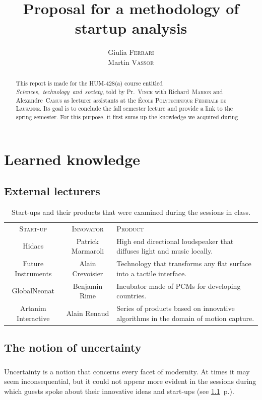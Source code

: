 \documentclass[twoside]{report}
\title{Proposal for a methodology of startup analysis}
\author{Giulia \textsc{Ferrari}\\Martin \textsc{Vassor}}
\begin{document}
\maketitle
\begin{abstract}
	This report is made for the HUM-428(a) course entitled \emph{Sciences,~technology~and~society}, told by Pr.~\textsc{Vinck} with Richard~\textsc{Marion} and Alexandre~\textsc{Camus} as lecturer assistants at the \textsc{École Polytechnique Fédérale de Lausanne}. Its goal is to conclude the fall semester lecture and provide a link to the spring semester. For this purpose, it first sums up the knowledge we acquired during 
\end{abstract}
\tableofcontents
\listoffigures
\listoftables
\chapter{Learned knowledge}
\section{External lecturers}
\begin{table}
\begin{tabular}{ccp{5cm}}
\textsc{Start-up} & \textsc{Innovator} & \textsc{Product} \\
Hidacs & Patrick Marmaroli & High end directional loudspeaker that diffuses light and music locally. \\
Future Instruments & Alain Crevoisier & Technology that transforms any flat surface into a tactile interface. \\
GlobalNeonat & Benjamin Rime & Incubator made of PCMs  for developing countries.\\
Artanim Interactive & Alain Renaud & Series of products based on innovative algorithms in the domain of motion capture. \\
\end{tabular}
\caption{Start-ups and their products that were examined during the sessions in class.}
\label{tab:lecturers}
\end{table}
\section{The notion of uncertainty}
\paragraph{}
Uncertainty is a notion that concerns every facet of modernity. At times it may seem inconsequential, but it could not appear more evident in the sessions during which guests spoke about their innovative ideas and start-ups (see \ref{tab:lecturers}~p.\pageref{tab:lecturers}). 
\end{document}
